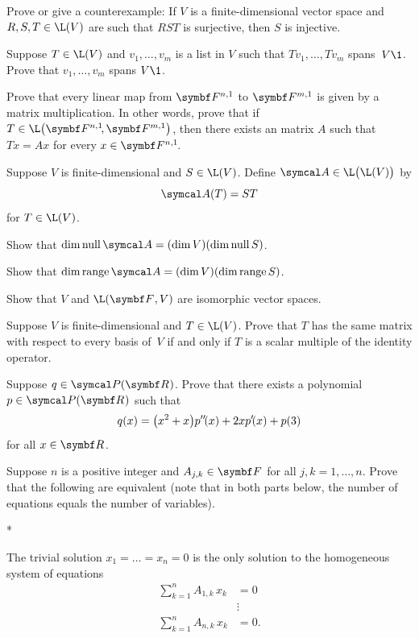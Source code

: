\begin{exercises}
\exercise
Prove or give a counterexample: If $V$ is a finite-dimensional vector space and $R, S, T \in
\L(V)$ are such that $RST$ is surjective, then $S$ is  injective.


\exercise
Suppose $T \in \L(V)$ and $v_1, \dots, v_m$ is a list in $V$ such that $Tv_1, \dots, Tv_m$ spans~$V\1$. Prove that
$v_1, \dots, v_m$ spans $V\1$.

\exercise
Prove that every linear map from $\F{n,1}$ to $\F{m,1}$ is given by a matrix multiplication.  In other words, prove that if
$T \in \L\paren[\big]{\FF{n,1}, \F{m,1}}$, then there exists an  matrix $A$ such that $Tx = Ax$ for every $x \in \FF{n,1}$.


\exercise
Suppose $V$ is finite-dimensional and $S \in \L(V)$. Define $\A \in \L\paren[\big]{\L(V)}$ by
\[
\A(T) = ST
\vspace{-6bp}
\]
for $T \in \L(V)$.
\begin{subtheorem}
\item
Show that $\dim \ker \A  = (\dim V)(\dim \ker S)$.
\item
Show that $\dim \ran \A  = (\dim V)(\dim \ran S)$.
\end{subtheorem}
\exercisesubtheoremend


\exercise
Show that $V$ and $\L(\F{}, V)$ are isomorphic vector spaces.


\exercise
Suppose $V$ is finite-dimensional and $T \in \L(V)$. Prove that $T$ has the same matrix with respect to every basis of~$V$ if and only if $T$ is a scalar multiple of the identity operator.


\exercise
Suppose $q \in \P(\R{})$. Prove that there exists a polynomial $p \in \P(\R{})$ such that
\[
q(x) = \paren[\big]{x^2 + x} p'' \! (x) +2x p' \! (x) + p(3)
\]
for all $x \in \R{}$.


\exercise
Suppose $n$ is a positive integer and $A_{j,k} \in \F{}$ for all $j,k = 1, \dots, n$.
Prove that the following are equivalent (note that in both parts below, the number of equations equals the number of  variables).
\begin{subtheorem}*
\item
The trivial solution $x_1 = \dots = x_n = 0$ is the only solution to the
homogeneous system of equations
\begin{align*}
\sum_{k=1}^n A_{1,k} \, x_k &= 0 \\
& \vdots \\
\sum_{k=1}^n A_{n,k} \, x_k &= 0.
\end{align*}


\end{subtheorem}
\end{exercises}

